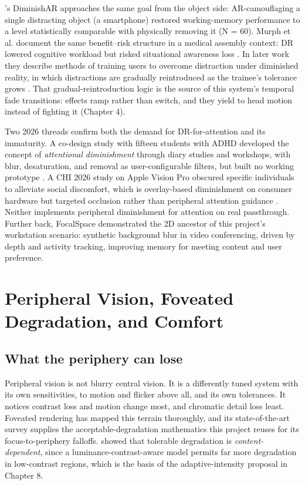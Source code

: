 \citet{lee2025}'s DiminishAR approaches the same goal from the object side: AR-camouflaging a
single distracting object (a smartphone) restored working-memory performance to a level statistically
comparable with physically removing it (N = 60). Murph et al. document the same benefit–risk
structure in a medical assembly context: DR lowered cognitive workload but risked situational
awareness loss \citep{murph2021}. In later work they describe methods of training users to
overcome distraction under diminished reality, in which distractions are gradually reintroduced as
the trainee's tolerance grows \citep{murph2022}. That gradual-reintroduction
logic is the source of this system's temporal fade transitions: effects ramp rather than switch, and
they yield to head motion instead of fighting it (Chapter 4).

Two 2026 threads confirm both the demand for DR-for-attention and its immaturity. A co-design study
with fifteen students with ADHD developed the concept of \textit{attentional diminishment} through diary
studies and workshops, with blur, desaturation, and removal as user-configurable filters, but built
no working prototype \citep{exploring}. A CHI 2026 study
on Apple Vision Pro obscured specific individuals to alleviate social discomfort, which is
overlay-based diminishment on consumer hardware but targeted occlusion rather than peripheral
attention guidance \citep{obscuring}. Neither implements peripheral
diminishment for attention on real passthrough. Further back, FocalSpace \citep{yao2013} demonstrated the 2D ancestor of this project's workstation scenario: synthetic
background blur in video conferencing, driven by depth and activity tracking, improving memory for
meeting content and user preference.

\section{Peripheral Vision, Foveated Degradation, and Comfort}

\subsection{What the periphery can lose}

Peripheral vision is not blurry central vision. It is a differently tuned system with its own
sensitivities, to motion and flicker above all, and its own tolerances. It notices contrast loss and
motion change most, and chromatic detail loss least. Foveated rendering has mapped this terrain
thoroughly, and its state-of-the-art survey \citep{wang2022} supplies the acceptable-degradation
mathematics this project reuses for its focus-to-periphery falloffs. \citet{tursun2019} showed that
tolerable degradation is \textit{content-dependent}, since a luminance-contrast-aware model permits far
more degradation in low-contrast regions, which is the basis of the adaptive-intensity proposal in
Chapter 8.

